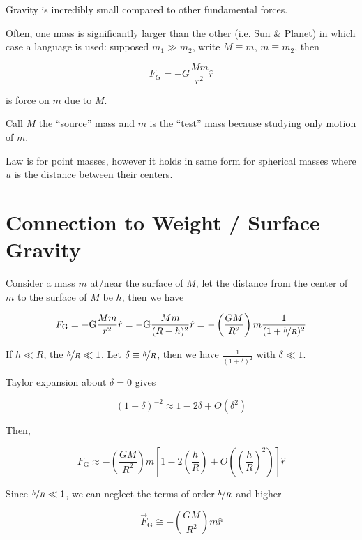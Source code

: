 Gravity is incredibly small compared to other fundamental forces.

Often, one mass is significantly larger than the other (i.e. Sun \& Planet) in which case a language is used: supposed $m_1 \gg m_2$, write $M \equiv m$, $m \equiv m_2$, then

\begin{equation}
	F_G = - G \frac{Mm}{r^2} \hat r
\end{equation}

is force on $m$ due to $M$.

Call $M$ the ``source'' mass and $m$ is the ``test'' mass because studying only motion of $m$.

Law is for point masses, however it holds in same form for spherical masses where $u$ is the distance between their centers.

\section{Connection to Weight / Surface Gravity}

Consider a mass $m$ at/near the surface of $M$, let the distance from the center of $m$ to the surface of $M$ be $h$, then we have

\begin{equation}
	F_\mathrm{G} = - \mathrm{G} \frac{Mm}{r^2} \hat r = - \mathrm{G} \frac{Mm}{(R + h)^2} \hat r = - \left(\frac{GM}{R^2}\right) m \frac{1}{(1 + \nicefrac{h}{R})^2}
\end{equation}

If $h \ll R$, the $\nicefrac{h}{R} \ll 1$. Let $\delta \equiv \nicefrac{h}{R}$, then we have $\frac{1}{(1 + \delta)^2}$ with $\delta \ll 1$.

Taylor expansion about $\delta = 0$ gives

\begin{equation}
	(1 + \delta)^{-2} \approx 1 - 2 \delta + O(\delta^2)
\end{equation}

Then,

\begin{equation}
	F_\mathrm{G} \approx  - \left(\frac{GM}{R^2}\right) m \left[1 - 2 \left(\frac{h}{R}\right) + O\left(\left(\frac{h}{R}\right)^2\right)\right] \hat r
\end{equation}

Since $\nicefrac{h}{R} \ll 1$, we can neglect the terms of order $\nicefrac{h}{R}$ and higher

\begin{equation}
	\vec F_\mathrm{G} \cong - \left(\frac{GM}{R^2}\right) m \hat r
\end{equation}

